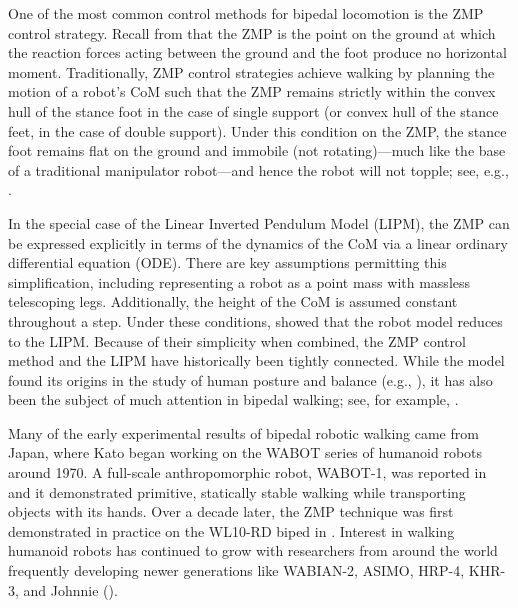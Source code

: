 One of the most common control methods for bipedal locomotion is the ZMP control strategy.
%
Recall from  that the ZMP is the point on the ground at which the reaction forces acting between the ground and the foot produce no horizontal moment.
%
Traditionally, ZMP control strategies achieve walking by planning the motion of a robot's CoM such that the ZMP remains strictly within the convex hull of the stance foot in the case of single support (or convex hull of the stance feet, in the case of double support).
%
Under this condition on the ZMP, the stance foot remains flat on the ground and immobile (not rotating)---much like the base of a traditional manipulator robot---and hence the robot will not topple; see, e.g., \cite{Yamaguchi1999}.

In the special case of the Linear Inverted Pendulum Model (LIPM),
%
%
the ZMP can be expressed explicitly in terms of the dynamics of the CoM via a linear ordinary differential equation (ODE).
%
There are key assumptions permitting this simplification, including representing a robot as a point mass with massless telescoping legs.
%
Additionally, the height of the CoM is assumed constant throughout a step.
%
Under these conditions, \cite{Kajita1991} showed that the robot model reduces to the LIPM.
%
%
Because of their simplicity when combined, the ZMP control method and the LIPM have historically been tightly connected.
%
%
%
%
While the model found its origins in the study of human posture and balance (e.g., \cite{Geursen1976,Winter1995,Patton1999}), it has also been the subject of much attention in bipedal walking; see, for example, \cite{Miura1984,Kajita2001,Kajita2010}.
%



Many of the early experimental results of bipedal robotic walking came from Japan, where Kato began working on the WABOT series of humanoid robots around 1970.
%
A full-scale anthropomorphic robot, WABOT-1, was reported in \cite{Kato1974} and it demonstrated primitive, statically stable walking while transporting objects with its hands.
%
Over a decade later, the ZMP technique was first demonstrated in practice on the WL10-RD biped in \cite{Takanishi1985}.
%
Interest in walking humanoid robots has continued to grow with researchers from around the world frequently developing newer generations like WABIAN-2, ASIMO, HRP-4, KHR-3, and Johnnie (\cite{Ogura2006,Sakagami2002,Kaneko2011,Park2005,Pfeiffer2002}).
%


